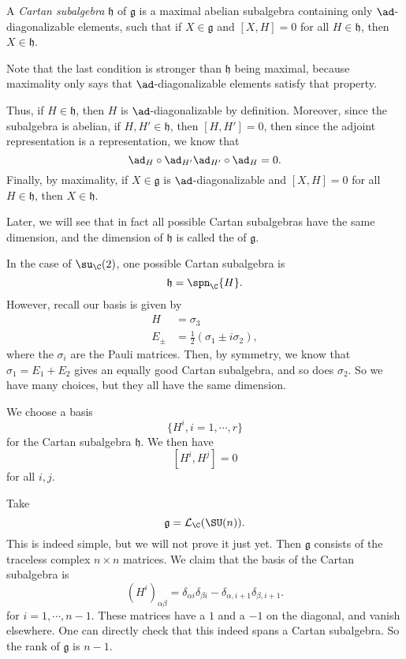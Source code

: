 \documentclass[a4paper]{article}
\begin{document}
\begin{defi}
  A \emph{Cartan subalgebra} $\mathfrak{h}$ of $\mathfrak{g}$ is a maximal abelian subalgebra containing only $\ad$-diagonalizable elements, such that if $X \in \mathfrak{g}$ and $[X, H] = 0$ for all $H \in \mathfrak{h}$, then $X \in \mathfrak{h}$.
\end{defi}
Note that the last condition is stronger than $\mathfrak{h}$ being maximal, because maximality only says that $\ad$-diagonalizable elements satisfy that property.

Thus, if $H \in \mathfrak{h}$, then $H$ is $\ad$-diagonalizable by definition. Moreover, since the subalgebra is abelian, if $H, H' \in \mathfrak{h}$, then $[H, H'] = 0$, then since the adjoint representation is a representation, we know that
\[
  \ad_H \circ \ad_{H'} \ad_{H'} \circ \ad_H = 0.
\]
Finally, by maximality, if $X \in \mathfrak{g}$ is $\ad$-diagonalizable and $[X, H] = 0$ for all $H \in \mathfrak{h}$, then $X \in \mathfrak{h}$.

Later, we will see that in fact all possible Cartan subalgebras have the same dimension, and the dimension of $\mathfrak{h}$ is called the  of $\mathfrak{g}$.

\begin{eg}
  In the case of $\su_\C(2)$, one possible Cartan subalgebra is
  \[
    \mathfrak{h} = \spn_\C \{H\}.
  \]
  However, recall our basis is given by
  \begin{align*}
    H &= \sigma_3\\
    E_{\pm} &= \frac{1}{2}(\sigma_1 \pm i \sigma_2),
  \end{align*}
  where the $\sigma_i$ are the Pauli matrices. Then, by symmetry, we know that $\sigma_1 = E_1 + E_2$ gives an equally good Cartan subalgebra, and so does $\sigma_2$. So we have many choices, but they all have the same dimension.
\end{eg}

We choose a basis
\[
  \{H^i, i = 1, \cdots, r\}
\]
for the Cartan subalgebra $\mathfrak{h}$. We then have
\[
  [H^i, H^j] = 0
\]
for all $i, j$.

\begin{eg}
  Take
  \[
    \mathfrak{g} = \mathcal{L}_\C(\SU(n)).
  \]
  This is indeed simple, but we will not prove it just yet. Then $\mathfrak{g}$ consists of the traceless complex $n \times n$ matrices. We claim that the basis of the Cartan subalgebra is
  \[
    (H^i)_{\alpha\beta} = \delta_{\alpha i} \delta_{\beta i} - \delta_{\alpha, i + 1} \delta_{\beta, i + 1}.
  \]
  for $i = 1, \cdots, n - 1$. These matrices have a $1$ and a $-1$ on the diagonal, and vanish elsewhere. One can directly check that this indeed spans a Cartan subalgebra. So the rank of $\mathfrak{g}$ is $n - 1$.
\end{eg}
\end{document}
